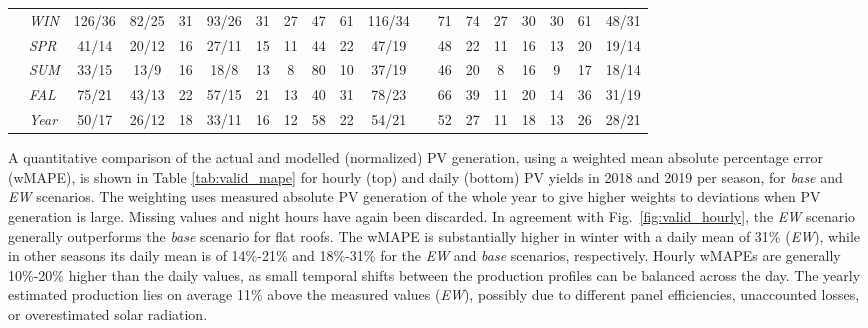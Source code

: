\begin{table}[tb]
{\begin{tabular}{llccccccccclccccccc}
\parbox[t]{2mm}{}  & \textit{WIN}     & 126/36      & 82/25       & 31          & 93/26       & 31          & 27          & 47          & 61          & 116/34      &  & 71         & 74         & 27         & 30          & 30          & 61          & 48/31                         \\
                        & \textit{SPR}     & 41/14       & 20/12       & 16          & 27/11       & 15          & 11          & 44          & 22          & 47/19       &  & 48         & 22         & 11         & 16          & 13          & 20          & 19/14                         \\
                        & \textit{SUM}     & 33/15       & 13/9        & 16          & 18/8        & 13          & 8           & 80          & 10          & 37/19       &  & 46         & 20         & 8          & 16          & 9           & 17          & 18/14                         \\
                        & \textit{FAL}     & 75/21       & 43/13       & 22          & 57/15       & 21          & 13          & 40          & 31          & 78/23       &  & 66         & 39         & 11         & 20          & 14          & 36          & 31/19                         \\
                        & \textit{Year}    & 50/17       & 26/12       & 18          & 33/11       & 16          & 12          & 58          & 22          & 54/21       &  & 52         & 27         & 11         & 18          & 13          & 26          & 28/21                         \\ \hline
\end{tabular}
}
\end{table}

A quantitative comparison of the actual and modelled (normalized) PV generation, using a weighted mean absolute percentage error (wMAPE), is shown in Table \ref{tab:valid_mape} for hourly (top) and daily (bottom) PV yields in 2018 and 2019 per season, for \textit{base} and \textit{EW} scenarios. The weighting uses measured absolute PV generation of the whole year to give higher weights to deviations when PV generation is large. Missing values and night hours have again been discarded. In agreement with Fig.~\ref{fig:valid_hourly}, the \textit{EW} scenario generally outperforms the \textit{base} scenario for flat roofs. The wMAPE is substantially higher in winter with a daily mean of 31\% (\textit{EW}), while in other seasons its daily mean is of 14\%-21\% and 18\%-31\% for the \textit{EW} and \textit{base} scenarios, respectively. Hourly wMAPEs are generally 10\%-20\% higher than the daily values, as small temporal shifts between the production profiles can be balanced across the day. The yearly estimated production lies on average 11\% above the measured values (\textit{EW}), possibly due to different panel efficiencies, unaccounted losses, or overestimated solar radiation. 

